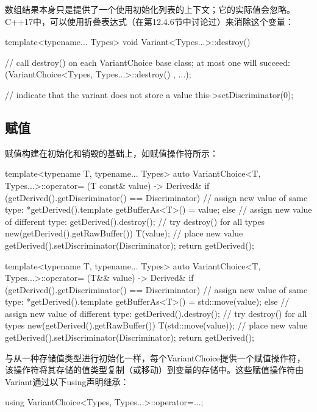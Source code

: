 数组结果本身只是提供了一个使用初始化列表的上下文；它的实际值会忽略。C++17中，可以使用折叠表达式（在第12.4.6节中讨论过）来消除这个变量：

\begin{cpp}
template<typename... Types>
void Variant<Types...>::destroy() {
	// call destroy() on each VariantChoice base class; at most one will succeed:
	(VariantChoice<Types, Types...>::destroy() , ...);
	
	// indicate that the variant does not store a value
	this->setDiscriminator(0);
}
\end{cpp}


\subsection{赋值}

赋值构建在初始化和销毁的基础上，如赋值操作符所示：

\begin{cpp}
template<typename T, typename... Types>
auto VariantChoice<T, Types...>::operator= (T const& value) -> Derived& {
	if (getDerived().getDiscriminator() == Discriminator) {
		// assign new value of same type:
		*getDerived().template getBufferAs<T>() = value;
	}
	else {
		// assign new value of different type:
		getDerived().destroy(); // try destroy() for all types
		new(getDerived().getRawBuffer()) T(value); // place new value
		getDerived().setDiscriminator(Discriminator);
	}
	return getDerived();
}

template<typename T, typename... Types>
auto VariantChoice<T, Types...>::operator= (T&& value) -> Derived& {
	if (getDerived().getDiscriminator() == Discriminator) {
		// assign new value of same type:
		*getDerived().template getBufferAs<T>() = std::move(value);
	}
	else {
		// assign new value of different type:
		getDerived().destroy(); // try destroy() for all types
		new(getDerived().getRawBuffer()) T(std::move(value)); // place new value
		getDerived().setDiscriminator(Discriminator);
	}
	return getDerived();
}
\end{cpp}

与从一种存储值类型进行初始化一样，每个VariantChoice提供一个赋值操作符，该操作符将其存储的值类型复制（或移动）到变量的存储中。这些赋值操作符由Variant通过以下using声明继承：

\begin{cpp}
using VariantChoice<Types, Types...>::operator=...;
\end{cpp}

